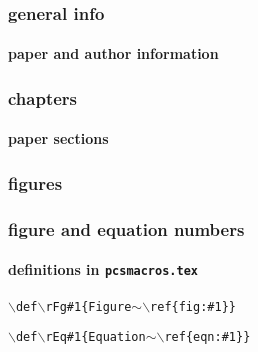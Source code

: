 \begin{frame} \frametitle{general info}
  \framesubtitle{paper and author information}
  \normalsize
\end{frame}
\cwpnote{}

\begin{frame} \frametitle{chapters}
  \framesubtitle{paper sections}
  \normalsize
\end{frame}
\cwpnote{}

\begin{frame} \frametitle{figures}
  \framesubtitle{}
  \normalsize
\end{frame}
\cwpnote{}

\begin{frame} \frametitle{figure and equation numbers}
  \framesubtitle{definitions in \texttt{pcsmacros.tex}}
  \normalsize
  \texttt{$\backslash$def$\backslash$rFg\#1\{Figure$\sim\backslash$ref\{fig:\#1\}\}}

\vfill

  \normalsize
    \texttt{$\backslash$def$\backslash$rEq\#1\{Equation$\sim\backslash$ref\{eqn:\#1\}\}}

\end{frame}
\cwpnote{}


